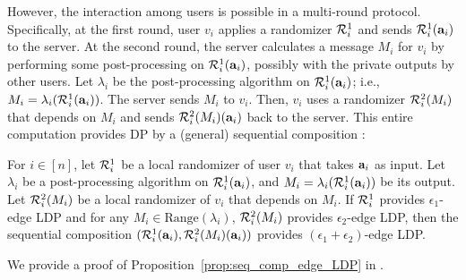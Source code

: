 However, the interaction 
among users 
is possible in a multi-round protocol. 
Specifically, 
at the first round, 
user $v_i$ applies a randomizer $\mathcal{R}_i^1$ and 
sends $\mathcal{R}_i^1(\mathbf{a}_i)$ to the server. 
At the second round, the server 
calculates a message $M_i$ for $v_i$ by 
performing 
some post-processing on $\mathcal{R}_i^1(\mathbf{a}_i)$, possibly with the private outputs by other users. 
Let $\lambda_i$ be the post-processing algorithm on $\mathcal{R}_i^1(\mathbf{a}_i)$; 
i.e., $M_i = \lambda_i(\mathcal{R}_i^1(\mathbf{a}_i))$. 
The server sends $M_i$ to $v_i$. 
Then, $v_i$ uses a randomizer $\mathcal{R}_i^2(M_i)$ that depends on $M_i$ and sends $\mathcal{R}_i^2(M_i)(\mathbf{a}_i)$ back to the server.
This entire computation 
provides 
DP by 
a (general) sequential composition \cite{DP_Li}: 

\begin{proposition}  
\label{prop:seq_comp_edge_LDP} 
  For 
  $i \in [n]$, let 
  $\mathcal{R}_i^1$ be a local randomizer of user $v_i$ that takes $\mathbf{a}_i$ as input. 
  Let $\lambda_i$ be a post-processing algorithm on $\mathcal{R}_i^1(\mathbf{a}_i)$, and $M_i = \lambda_i(\mathcal{R}_i^1(\mathbf{a}_i))$ be its output. 
  Let $\mathcal{R}_i^2(M_i)$ be a local randomizer of $v_i$ that depends on $M_i$. 
  If $\mathcal{R}_i^1$ provides $\epsilon_1$-edge LDP and for any 
  $M_i \in \mathrm{Range}(\lambda_i)$,
  $\mathcal{R}_i^2(M_i)$ provides $\epsilon_2$-edge LDP, 
then the sequential composition 
$(\mathcal{R}_i^1(\mathbf{a}_i), \mathcal{R}_i^2(M_i)(\mathbf{a}_i))$
provides $(\epsilon_1 + \epsilon_2)$-edge LDP.
\end{proposition}
We provide a proof of Proposition~\ref{prop:seq_comp_edge_LDP} in .

